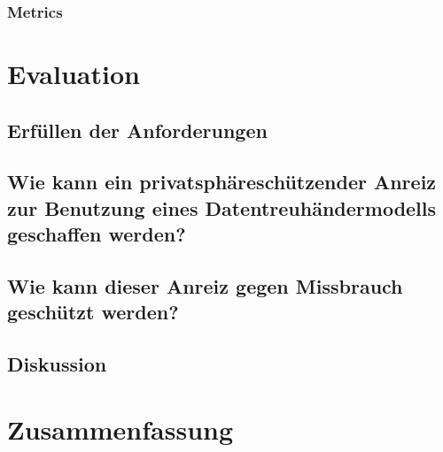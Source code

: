 \documentclass{scrreprt}
\begin{document}
\subsection{Metrics}






\chapter{Evaluation}
\section{Erfüllen der Anforderungen}

\section{Wie kann ein privatsphäreschützender Anreiz zur Benutzung eines Datentreuhändermodells geschaffen werden?}
\section{Wie kann dieser Anreiz gegen Missbrauch geschützt werden?}

\section{Diskussion}
\label{sec:discussion}




\chapter{Zusammenfassung}


\end{document}
